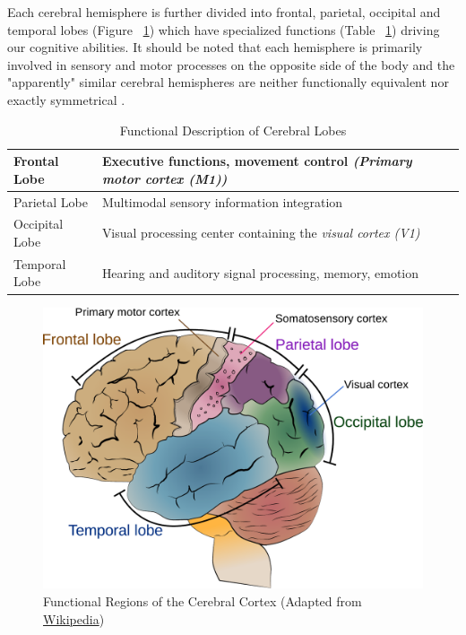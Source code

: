 \documentclass[12pt]{article}
\numberwithin{equation}{section}
\numberwithin{figure}{section}
\numberwithin{table}{section}
\begin{document}
\par{
    Each cerebral hemisphere is further divided
    into frontal, parietal, occipital and temporal lobes (Figure ~\ref{fig:brain_parts})
    which have specialized functions (Table ~\ref{table:brain_functions}) driving our cognitive abilities.
    It should be noted that each hemisphere is primarily involved in sensory and motor processes on
    the opposite side of the body and the "apparently" similar cerebral hemispheres are
    neither functionally equivalent nor exactly symmetrical \citep{kandel_principles_2013}.

\begin{table}[H]
    \footnotesize
    \centering
    \caption{Functional Description of Cerebral Lobes}
    \begin{tabular}{l l}
        \hline
        Frontal Lobe & Executive functions, movement control \emph{(Primary motor cortex (M1))}\\ \hline
        Parietal Lobe & Multimodal sensory information integration \\ \hline
        Occipital Lobe & Visual processing center containing the \emph{visual cortex (V1)} \\ \hline
        Temporal Lobe & Hearing and auditory signal processing, memory, emotion\\ \hline
    \end{tabular}
    \label{table:brain_functions}
\end{table}

\begin{figure}[ht]
    \centering
    \includegraphics[scale=0.5]{images/Cerebrum_lobes}
    \caption[Functional Regions of the Cerebral Cortex]{Functional Regions of the Cerebral Cortex (Adapted from \href{http://en.wikipedia.org/wiki/File:Cerebrum_lobes.svg}{Wikipedia})}
    \label{fig:brain_parts}
\end{figure}
}
\end{document}

